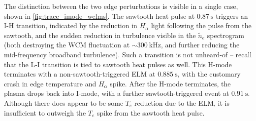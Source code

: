 \begin{figure}[h]
 \pushtooutside
\end{figure}

The distinction between the two edge perturbations is visible in a single case, shown in \cref{fig:trace_imode_welms}.  The sawtooth heat pulse at $\SI{0.87}{\second}$ triggers an I-H transition, indicated by the reduction in $H_\alpha$ light following the pulse from the sawtooth, and the sudden reduction in turbulence visible in the $\tilde{n}_e$ spectrogram (both destroying the WCM fluctuation at $\sim \SI{300}{\kilo\hertz}$, and further reducing the mid-frequency broadband turbulence).  Such a transition is not unheard-of -- recall that the L-I transition is tied to sawtooth heat pulses as well.  This H-mode terminates with a non-sawtooth-triggered ELM at $\SI{0.885}{\second}$, with the customary crash in edge temperature and $H_\alpha$ spike.  After the H-mode terminates, the plasma drops back into I-mode, with a further sawtooth-triggered event at $\SI{0.91}{\second}$.  Although there does appear to be some $T_e$ reduction due to the ELM, it is insufficient to outweigh the $T_e$ spike from the sawtooth heat pulse.

